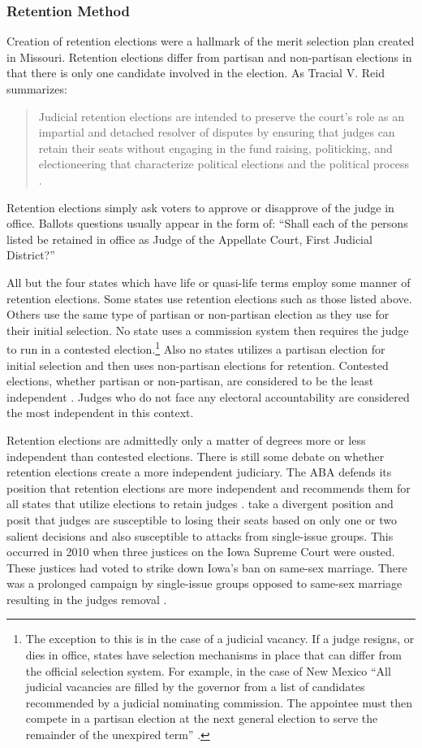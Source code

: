 \documentclass[12pt]{article}
\begin{document}
\subsubsection*{Retention Method}
Creation of retention elections were a hallmark of the merit selection plan created in Missouri. Retention elections differ from partisan and non-partisan elections in that there is only one candidate involved in the election. As Tracial V. Reid summarizes: \begin{quote}Judicial retention elections are intended to preserve the court’s role as an impartial and detached resolver of disputes by ensuring that judges can retain their seats without engaging in the fund raising, politicking, and electioneering that characterize political elections and the political process \citep[68]{Reid1999}.\end{quote}  Retention elections simply ask voters to approve or disapprove of the judge in office. Ballots questions usually appear in the form of: ``Shall each of the persons listed be retained in office as Judge of the Appellate Court, First Judicial District?''

All but the four states which have life or quasi-life terms employ some manner of retention elections. Some states use retention elections such as those listed above. Others use the same type of partisan or non-partisan election as they use for their initial selection. No state uses a commission system then requires the judge to run in a contested election.\footnote{The exception to this is in the case of a judicial vacancy.  If a judge resigns, or dies in office, states have selection mechanisms in place that can differ from the official selection system.  For example, in the case of New Mexico ``All judicial vacancies are filled by the governor from a list of candidates recommended by a judicial nominating commission. The appointee must then compete in a partisan election at the next general election to serve the remainder of the unexpired term'' \citep{AJS}.}  Also no states utilizes a partisan election for initial selection and then uses non-partisan elections for retention.  Contested elections, whether partisan or non-partisan, are considered to be the least independent \citep{Choi2010,ABA2003,Canes-Wrone2012}. Judges who do not face any electoral accountability are considered the most independent in this context.

Retention elections are admittedly only a matter of degrees more or less independent than contested elections. There is still some debate on whether retention elections create a more independent judiciary. The ABA defends its position that retention elections are more independent and recommends them for all states that utilize elections to retain judges \citep{ABA2003}.  \citep{Canes-Wrone2012} take a divergent position and posit that judges are susceptible to losing their seats based on only one or two salient decisions and also susceptible to attacks from single-issue groups.  This occurred in 2010 when three justices on the Iowa Supreme Court were ousted. These justices had voted to strike down Iowa’s ban on same-sex marriage. There was a prolonged campaign by single-issue groups opposed to same-sex marriage resulting in the judges removal \citep{Iowa2010}.
\end{document}
